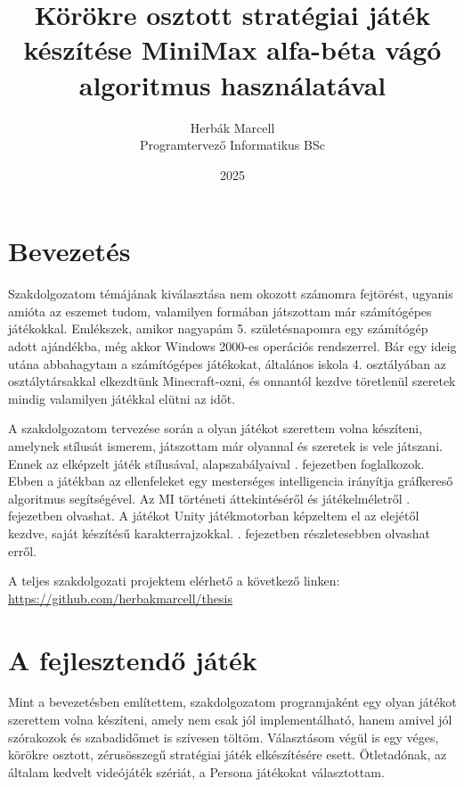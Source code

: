 \documentclass[
]{thesis-ekf}
\theoremstyle{definition}
\theoremstyle{remark}
\begin{document}
\title{Körökre osztott stratégiai játék készítése MiniMax alfa-béta vágó algoritmus használatával}
\author{Herbák Marcell\\Programtervező Informatikus BSc}
\date{2025}
\maketitle

\tableofcontents

\chapter{Bevezetés}

Szakdolgozatom témájának kiválasztása nem okozott számomra fejtörést, ugyanis amióta az eszemet tudom, valamilyen formában játszottam már számítógépes játékokkal. Emlékszek, amikor nagyapám 5. születésnapomra egy számítógép adott ajándékba, még akkor Windows 2000-es operációs rendszerrel. Bár egy ideig utána abbahagytam a számítógépes játékokat, általános iskola 4. osztályában az osztálytársakkal elkezdtünk Minecraft-ozni, és onnantól kezdve töretlenül szeretek mindig valamilyen játékkal elütni az időt. 

A szakdolgozatom tervezése során a olyan játékot szerettem volna készíteni, amelynek stílusát ismerem, játszottam már olyannal és szeretek is vele játszani. Ennek az elképzelt játék stílusával, alapszabályaival . fejezetben foglalkozok. Ebben a játékban az ellenfeleket egy mesterséges intelligencia irányítja gráfkereső algoritmus segítségével. Az MI történeti áttekintéséről és játékelméletről . fejezetben olvashat. A játékot Unity játékmotorban képzeltem el az elejétől kezdve, saját készítésű karakterrajzokkal. . fejezetben részletesebben olvashat erről.

A teljes szakdolgozati projektem elérhető a következő linken: \url{https://github.com/herbakmarcell/thesis}

\chapter{A fejlesztendő játék} \label{dev-game}

Mint a bevezetésben említettem, szakdolgozatom programjaként egy olyan játékot szerettem volna készíteni, amely nem csak jól implementálható, hanem amivel jól szórakozok és szabadidőmet is szívesen töltöm. Választásom végül is egy véges, körökre osztott, zérusösszegű stratégiai játék elkészítésére esett. Ötletadónak, az általam kedvelt videójáték szériát, a Persona játékokat választottam. \cite{Persona}
\end{document}
